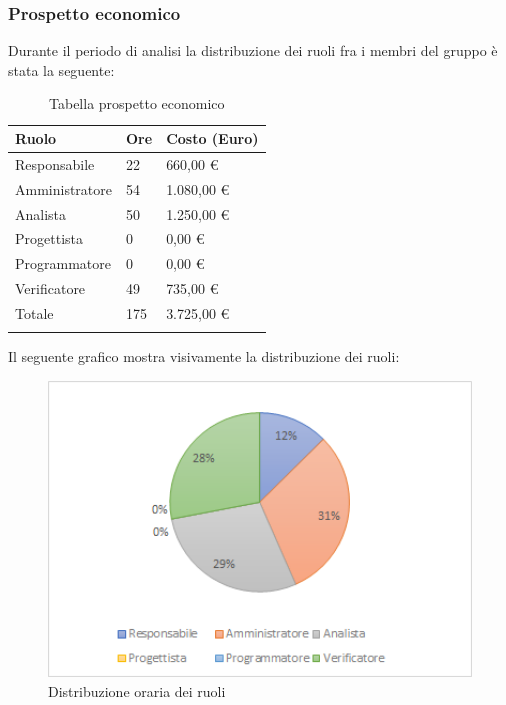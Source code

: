 \subsubsection{Prospetto economico}
Durante il periodo di analisi la distribuzione dei ruoli fra i membri del gruppo è stata la seguente:
\begin{center}
	\renewcommand{\arraystretch}{1.5}
	\begin{longtable}[H]{  p{5.6cm}  p{3cm} p{3cm}  }
		\rowcolor{tableHeadYellow}
		\textbf{Ruolo}   & \textbf{Ore} & \textbf{Costo (Euro)} \\ 
		\endhead
		Responsabile   & 22   & 660,00 \euro \\
		Amministratore & 54   & 1.080,00 \euro \\
		Analista       & 50   & 1.250,00 \euro\\
		Progettista    & 0    & 0,00 \euro \\
		Programmatore  & 0    & 0,00 \euro \\
		Verificatore   & 49   & 735,00 \euro\\
		Totale         & 175   & 3.725,00 \euro \\
		\rowcolor{white}
		\caption{Tabella prospetto economico}
	\end{longtable}
\end{center}
Il seguente grafico mostra visivamente la distribuzione dei ruoli:
\begin{figure}[H]
	\centering
	\includegraphics[width=15cm,keepaspectratio]{../includes/pics/grafici/grafico2.png}
	\caption{\label{fig:mission}Distribuzione oraria dei ruoli}
\end{figure}
\clearpage
